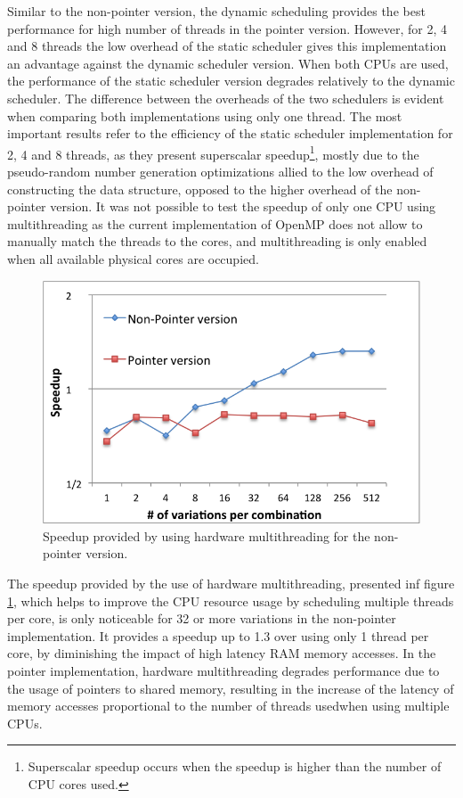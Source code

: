 Similar to the non-pointer version, the dynamic scheduling provides the best performance for high number of threads in the pointer version. However, for 2, 4 and 8 threads the low overhead of the static scheduler gives this implementation an advantage against the dynamic scheduler version. When both CPUs are used, the performance of the static scheduler version degrades relatively to the dynamic scheduler. The difference between the overheads of the two schedulers is evident when comparing both implementations using only one thread. The most important results refer to the efficiency of the static scheduler implementation for 2, 4 and 8 threads, as they present superscalar speedup\footnote{Superscalar speedup occurs when the speedup is higher than the number of CPU cores used.}, mostly due to the pseudo-random number generation optimizations allied to the low overhead of constructing the data structure, opposed to the higher overhead of the non-pointer version. It was not possible to test the speedup of only one CPU using multithreading as the current implementation of OpenMP does not allow to manually match the threads to the cores, and multithreading is only enabled when all available physical cores are occupied.

\begin{figure}[!htp]
	\begin{center}
		\includegraphics[scale=0.7]{../../common/graphs/ht_speedup.png}
		\caption{Speedup provided by using hardware multithreading for the non-pointer version.}
		\label{fig:HTSpeedup}
	\end{center}
\end{figure}

The speedup provided by the use of hardware multithreading, presented inf figure \ref{fig:HTSpeedup}, which helps to improve the CPU resource usage by scheduling multiple threads per core, is only noticeable for 32 or more variations in the non-pointer implementation. It provides a speedup up to 1.3 over using only 1 thread per core, by diminishing the impact of high latency RAM memory accesses. In the pointer implementation, hardware multithreading degrades performance due to the usage of pointers to shared memory, resulting in the increase of the latency of memory accesses proportional to the number of threads usedwhen using multiple CPUs.

